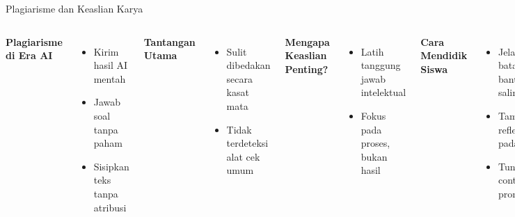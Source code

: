 \documentclass[aspectratio=169, table]{beamer}
\begin{document}
	\begin{frame}[fragile]{Plagiarisme dan Keaslian Karya}
		\vspace{15pt}
		\begin{columns}[T]
			\textbf{Plagiarisme di Era AI}
			\begin{itemize}
				\item Kirim hasil AI mentah
				\item Jawab soal tanpa paham
				\item Sisipkan teks tanpa atribusi
			\end{itemize}
			
			\textbf{Tantangan Utama}
			\begin{itemize}
				\item Sulit dibedakan secara kasat mata
				\item Tidak terdeteksi alat cek umum
			\end{itemize}
			
			\textbf{Mengapa Keaslian Penting?}
			\begin{itemize}
				\item Latih tanggung jawab intelektual
				\item Fokus pada proses, bukan hasil
			\end{itemize}
			
			\textbf{Cara Mendidik Siswa}
			\begin{itemize}
				\item Jelaskan batas bantu vs salin
				\item Tambahkan refleksi pada tugas
				\item Tunjukkan contoh prompt etis
			\end{itemize}
			
			\textbf{Peran Guru dan Sekolah}
			\begin{itemize}
				\item Buat kebijakan penggunaan AI
				\item Bahas etika digital di kelas
				\item Nilai proses, bukan hanya hasil
			\end{itemize}
			
			\textbf{Kesimpulan}
			\begin{itemize}
				\item AI bantu, bukan pengganti
				\item Keaslian bukti keterlibatan belajar
			\end{itemize}
		\end{columns}
	\end{frame}
	
\end{document}
